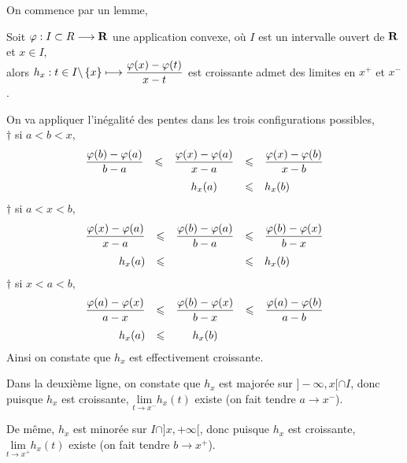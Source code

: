 \documentclass[a4paper,11pt, twoside]{article}
\begin{document}
On commence par un lemme,


\begin{lemme}
  Soit $\varphi:I\subset R\longrightarrow\mathbf R$ une application convexe, où $I$ est un intervalle ouvert de $\mathbf R$ et $x\in I$,\\

  alors $h_x:t\in I\backslash\left\{x\right\}\longmapsto\displaystyle\frac{\varphi(x)-\varphi(t)}{x-t}$ est croissante admet des limites en $x^+$ et $x^-$.
\end{lemme}


\begin{Proof}
  On va appliquer l'inégalité des pentes dans les trois configurations possibles,\\
  $\dagger$ si $a<b<x$,
  $$\begin{array}{rcccl}
    \displaystyle\frac{\varphi(b)-\varphi(a)}{b-a}&\leqslant&\displaystyle\frac{\varphi(x)-\varphi(a)}{x-a}&\leqslant& \displaystyle\frac{\varphi(x)-\varphi(b)}{x-b}\\[1.1em]
    &&h_x(a)&\leqslant& h_x(b)
  \end{array}$$
  $\dagger$ si $a<x<b$,
  $$\begin{array}{rcccl}
    \displaystyle\frac{\varphi(x)-\varphi(a)}{x-a}&\leqslant&\displaystyle\frac{\varphi(b)-\varphi(a)}{b-a}&\leqslant& \displaystyle\frac{\varphi(b)-\varphi(x)}{b-x}\\[1.1em]
    h_x(a)&\leqslant& &\leqslant& h_x(b)
  \end{array}$$
  $\dagger$ si $x<a<b$,
  $$\begin{array}{rcccl}
    \displaystyle\frac{\varphi(a)-\varphi(x)}{a-x}&\leqslant&\displaystyle\frac{\varphi(b)-\varphi(x)}{b-x}&\leqslant&\displaystyle\frac{\varphi(a)-\varphi(b)}{a-b}\\[1.1em]
  h_x(a)&\leqslant&h_x(b)&&
  \end{array}$$
  Ainsi on constate que $h_x$ est effectivement croissante.

  Dans la deuxième ligne, on constate que $h_x$ est majorée sur $]-\infty,x[\cap I$, donc puisque $h_x$ est croissante, $\underset{t\to x^-}{\mathrm{lim}}h_x(t)$ existe (on fait tendre $a\to x^-$).

  De même, $h_x$ est minorée sur $I\cap]x,+\infty[$, donc puisque $h_x$ est croissante, $\underset{t\to x^+}{\mathrm{lim}}h_x(t)$ existe (on fait tendre $b\to x^+$).
\end{Proof}
\end{document}
